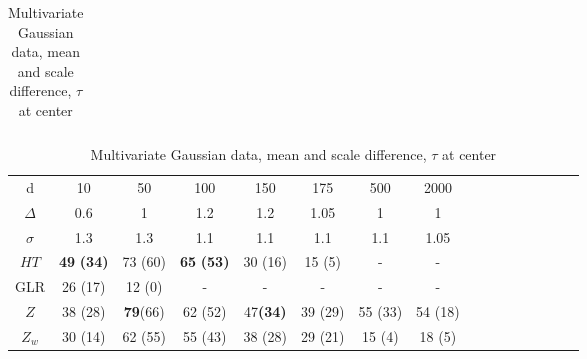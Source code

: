 \documentclass[arxiv, preprint]{imsart}
\numberwithin{equation}{section}
\theoremstyle{plain}
\begin{document}
\begin{table}[!htp]
\begin{tabular}{p{1cm}|ccccccccccccc}
 \hline\hline
\end{tabular}
\label{table:l_150} 
\vspace{1mm}
\vspace{1mm}
\caption{Multivariate Gaussian data, mean and scale difference, $\tau$ at center }
\begin{tabular}{c|ccccccccccccccc}
\hline
\hline
  d      & 10  & 50   & 100 & 150 & 175  &  500 & 2000\\
$\Delta$ & 0.6 & 1    & 1.2 & 1.2 & 1.05 & 1    & 1 \\
$\sigma$ & 1.3 & 1.3  & 1.1 & 1.1 & 1.1  & 1.1  & 1.05 \\
\hline
\hline
$HT$ & \textbf{49} \textbf{(34)}&  73 (60)  &  \textbf{65} \textbf{(53)}& 30 (16) & 15 (5) & - & -  \\
\hline
GLR & 26 (17)&  12 (0) &  -  &  - & - & - & -\\
\hline
$Z$ & 38  (28) &  \textbf{79}(66) & 62 (52)& 47\textbf{(34)} & 39 (29)& 55 (33) &  54 (18)\\
\hline
$Z_w$ & 30 (14) & 62 (55)&  55  (43)& 38 (28)& 29 (21)& 15 (4) & 18 (5) \\

\end{tabular}
\end{table}
\end{document}
